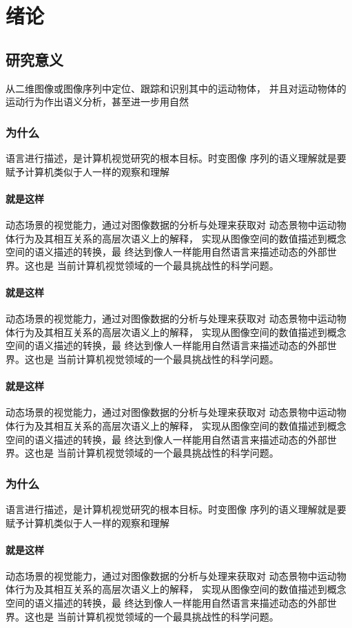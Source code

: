 \chapter{绪\;\;\;论}
\label{chap1}

\section{研究意义}

从二维图像或图像序列中定位、跟踪和识别其中的运动物体，\cite{haag:optical}
并且对运动物体的运动行为作出语义分析，甚至进一步用自然
\subsection{为什么}
语言进行描述，是计算机视觉研究的根本目标。时变图像
序列的语义理解就是要赋予计算机类似于人一样的观察和理解
\subsubsection{就是这样}
动态场景的视觉能力，通过对图像数据的分析与处理来获取对
动态景物中运动物体行为及其相互关系的高层次语义上的解释，
实现从图像空间的数值描述到概念空间的语义描述的转换，最
终达到像人一样能用自然语言来描述动态的外部世界。这也是
当前计算机视觉领域的一个最具挑战性的科学问题。
\subsubsection{就是这样}
动态场景的视觉能力，通过对图像数据的分析与处理来获取对
动态景物中运动物体行为及其相互关系的高层次语义上的解释，
实现从图像空间的数值描述到概念空间的语义描述的转换，最
终达到像人一样能用自然语言来描述动态的外部世界。这也是
当前计算机视觉领域的一个最具挑战性的科学问题。
\subsubsection{就是这样}
动态场景的视觉能力，通过对图像数据的分析与处理来获取对
动态景物中运动物体行为及其相互关系的高层次语义上的解释，
实现从图像空间的数值描述到概念空间的语义描述的转换，最
终达到像人一样能用自然语言来描述动态的外部世界。这也是
当前计算机视觉领域的一个最具挑战性的科学问题。
\subsection{为什么}
语言进行描述，是计算机视觉研究的根本目标。时变图像
序列的语义理解就是要赋予计算机类似于人一样的观察和理解
\subsubsection{就是这样}
动态场景的视觉能力，通过对图像数据的分析与处理来获取对
动态景物中运动物体行为及其相互关系的高层次语义上的解释，
实现从图像空间的数值描述到概念空间的语义描述的转换，最
终达到像人一样能用自然语言来描述动态的外部世界。这也是
当前计算机视觉领域的一个最具挑战性的科学问题。
